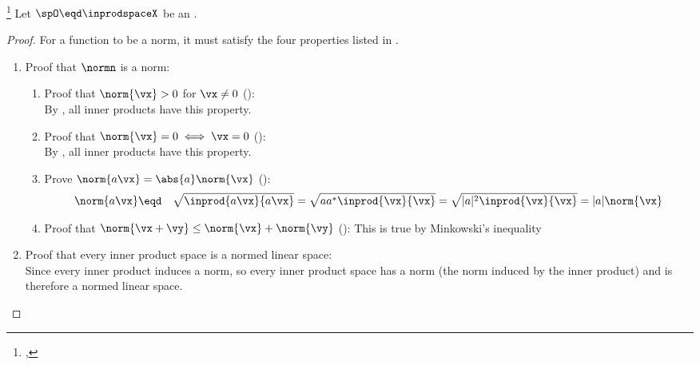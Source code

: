 \begin{theorem}
\footnote{
  ,
  }
\label{thm:norm=inprod}
\label{thm:inducednorm}
Let $\spO\eqd\inprodspaceX$ be an  .
\end{theorem}
\begin{proof}
For a function to be a norm, it must satisfy the four properties listed in
.
\begin{enumerate}
  \item Proof that $\normn$ is a norm:
\begin{enumerate}
  \item Proof that $\norm{\vx}>0$ for $\vx\ne 0$ (): \\
    By , all inner products have this property.

  \item Proof that $\norm{\vx}=0 \iff \vx=0$ (): \\
    By , all inner products have this property.

  \item Prove $\norm{a\vx}=\abs{a}\norm{\vx}$ ():
  \begin{eqnarray*}
    \norm{a\vx}
      &\eqd& \sqrt{\inprod{a\vx}{a\vx}}
      = \sqrt{a a^\ast \inprod{\vx}{\vx}}
      = \sqrt{|a|^2 \inprod{\vx}{\vx}}
      = |a| \norm{\vx}
  \end{eqnarray*}

  \item Proof that $\norm{\vx+\vy}\le\norm{\vx}+\norm{\vy}$ (): 
        This is true by Minkowski's inequality 
\end{enumerate}

  \item Proof that every inner product space is a normed linear space:\\
    Since every inner product induces a norm, so every inner product space
    has a norm (the norm induced by the inner product)
    and is therefore a normed linear space.
\end{enumerate}
\end{proof}

